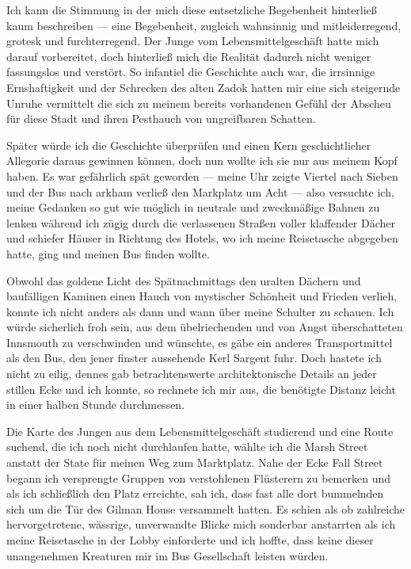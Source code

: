 Ich kann die Stimmung in der mich diese entsetzliche Begebenheit hinterließ kaum beschreiben --- eine Begebenheit, zugleich wahnsinnig und mitleiderregend, grotesk und furchterregend. Der Junge vom Lebensmittelgeschäft hatte mich darauf vorbereitet, doch hinterließ mich die Realität dadurch nicht weniger fassungslos und verstört. So infantiel die Geschichte auch war, die irrsinnige Ernshaftigkeit und der Schrecken des alten Zadok hatten mir eine sich steigernde Unruhe vermittelt die sich zu meinem bereits vorhandenen Gefühl der Abscheu für diese Stadt und ihren Pesthauch von ungreifbaren Schatten.

Später würde ich die Geschichte überprüfen und einen Kern geschichtlicher Allegorie daraus gewinnen können, doch nun wollte ich sie nur aus meinem Kopf haben. Es war gefährlich spät geworden --- meine Uhr zeigte Viertel nach Sieben und der Bus nach arkham verließ den Markplatz um Acht --- also versuchte ich, meine Gedanken so gut wie möglich in neutrale und zweckmäßige Bahnen zu lenken während ich zügig durch die verlassenen Straßen voller klaffender Dächer und schiefer Häuser in Richtung des Hotels, wo ich meine Reisetasche abgegeben hatte, ging und meinen Bus finden wollte.

Obwohl das goldene Licht des Spätnachmittags den uralten Dächern und baufälligen Kaminen einen Hauch von mystischer Schönheit und Frieden verlieh, konnte ich nicht anders als dann und wann über meine Schulter zu schauen. Ich würde sicherlich froh sein, aus dem übelriechenden und von Angst überschatteten Innsmouth zu verschwinden und wünschte, es gäbe ein anderes Transportmittel als den Bus, den jener finster aussehende Kerl Sargent fuhr. Doch hastete ich nicht zu eilig, dennes gab betrachtenswerte architektonische Details an jeder stillen Ecke und ich konnte, so rechnete ich mir aus, die benötigte Distanz leicht in einer halben Stunde durchmessen.

Die Karte des Jungen aus dem Lebensmittelgeschäft studierend und eine Route suchend, die ich noch nicht durchlaufen hatte, wählte ich die Marsh Street anstatt der State für meinen Weg zum Marktplatz. Nahe der Ecke Fall Street begann ich versprengte Gruppen von verstohlenen Flüsterern zu bemerken und als ich schließlich den Platz erreichte, sah ich, dass fast alle dort bummelnden sich um die Tür des Gilman House versammelt hatten. Es schien als ob zahlreiche hervorgetretene, wässrige, unverwandte Blicke mich sonderbar anstarrten als ich meine Reisetasche in der Lobby einforderte und ich hoffte, dass keine dieser unangenehmen Kreaturen mir im Bus Gesellschaft leisten würden.

